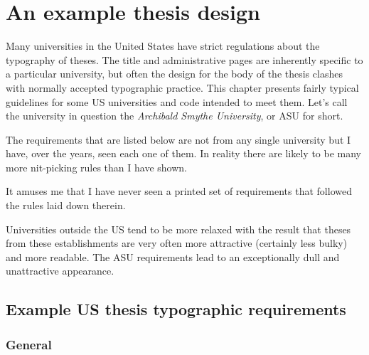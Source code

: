 \chapter{An example thesis design} \label{chap:thesis}

    Many universities in the United States have strict regulations about 
the typography of theses.
The title and administrative pages are inherently specific to a particular 
university, but often the design for the body of the thesis clashes 
with normally accepted typographic practice. This chapter presents 
fairly typical guidelines for some US universities and code intended 
to meet them. Let's call the university in question the 
\emph{Archibald Smythe University}, or ASU for short. 

    The requirements that are listed below are not from any single
university but I have, over the years, seen each one of them. In reality
there are likely to be many more nit-picking rules than I have shown.

    It amuses me that I have never seen a printed set of requirements that 
followed the rules laid down therein.

    Universities outside the US tend to be more relaxed with the result
that theses from these establishments are very often more attractive (certainly
less bulky) and more readable. The ASU requirements lead to an exceptionally
dull and unattractive appearance.

\section{Example US thesis typographic requirements}

\subsection{General}  

